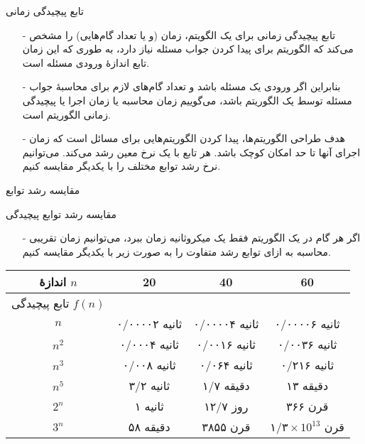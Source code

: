 
\begin{frame}{تابع پیچیدگی زمانی}

\begin{itemize}\itmsep{5mm}
\item[-]
تابع پیچیدگی زمانی برای یک الگویتم، زمان (و یا تعداد گام‌هایی) را مشخص می‌کند که الگوریتم برای پیدا کردن جواب مسئله نیاز دارد،
به طوری که این زمان تابع اندازهٔ ورودی مسئله است.
\item[-]
بنابراین اگر ورودی یک مسئله 
 باشد و تعداد گام‌های لازم برای محاسبهٔ جواب مسئله توسط یک الگوریتم 
باشد، می‌گوییم زمان محاسبه
یا زمان اجرا
 یا پیچیدگی زمانی
  الگوریتم
است.
\item[-]
هدف طراحی الگوریتم‌ها، پیدا کردن الگوریتم‌هایی برای مسائل است که زمان اجرای آنها تا حد امکان کوچک باشد.
هر تابع با یک نرخ معین رشد می‌کند.
می‌توانیم نرخ رشد توابع
 مختلف را با یکدیگر مقایسه کنیم.
\end{itemize}

\end{frame}

\begin{frame}{مقایسه رشد توابع}

\begin{figure}[!ht]
\centering

\label{fig:complexity}
\end{figure}

\end{frame}

\begin{frame}{مقایسه رشد توابع پیچیدگی}

\begin{itemize}\itmsep{2mm}
\item[-]
اگر هر گام در یک الگوریتم فقط یک میکروثانیه زمان ببرد، می‌توانیم زمان تقریبی محاسبه به ازای توابع رشد متفاوت را به صورت زیر با یکدیگر مقایسه کنیم.
\end{itemize}

\begin{center}
\begin{tabular}{c | c c c}
اندازهٔ $n$ 
 & 20 & 40 & 60 \\ \hline
تابع پیچیدگی $f(n)$ &  & &
\\
$n$ &
۰/‌۰۰۰۰۲ ثانیه &
۰/‌۰۰۰۰۴ ثانیه &
۰/‌۰۰۰۰۶ ثانیه \\
$n^2$ &
۰/‌۰۰۰۴ ثانیه &
۰/‌۰۰۱۶ ثانیه &
۰/‌۰۰۳۶ ثانیه \\
$n^3$ &
۰/‌۰۰۸ ثانیه &
۰/‌۰۶۴ ثانیه &
۰/‌۲۱۶ ثانیه \\
$n^5$ &
۳/۲ ثانیه &
۱/۷ دقیقه &
۱۳ دقیقه \\
$2^n$ &
۱ ثانیه &
۱۲/۷ روز &
۳۶۶ قرن \\
$3^n$ &
۵۸ دقیقه &
۳۸۵۵ قرن &
$\text{۱/۳} \times \text{10}^\text{13}$ قرن 
\\
\end{tabular}
\end{center}
\end{frame}


